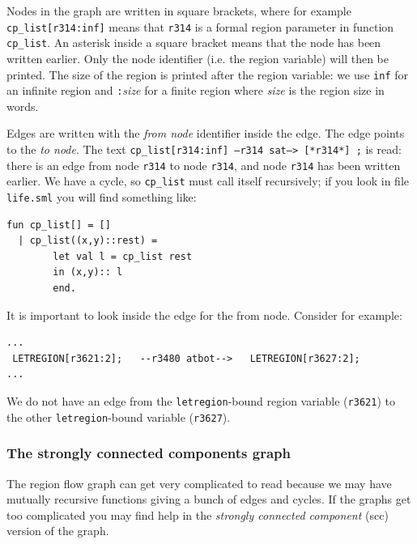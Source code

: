 \documentclass[12pt]{book}
\begin{document}
Nodes in the graph are written in square brackets, where for example
\texttt{cp\_list[r314:inf]} means that \texttt{r314} is a formal region
parameter in function \texttt{cp\_list}. An asterisk inside a square
bracket means that the node has been written earlier. Only the node
identifier (i.e. the region variable) will then be printed. The size of the
region is printed after the region variable: we use \texttt{inf} for an
infinite region and \texttt{:}\emph{size} for a finite region where
\emph{size} is the region size in words.

Edges are written with the \emph{from node} identifier inside the
edge. The edge points to the \emph{to node}. The text
\texttt{cp\_list[r314:inf]  --r314 sat-->   [*r314*] ;} is read: there
is an edge from node \texttt{r314} to node \texttt{r314}, and node
\texttt{r314} has been written earlier. We have a cycle, so
\texttt{cp\_list} must call itself recursively; if you look in file
\texttt{life.sml} you will find something like:

\begin{verbatim}
fun cp_list[] = []
  | cp_list((x,y)::rest) = 
        let val l = cp_list rest
        in (x,y):: l
        end.
\end{verbatim}
\noindent
It is important to look inside the edge for the from node. Consider for
example:
\begin{verbatim}
...
 LETREGION[r3621:2];   --r3480 atbot-->   LETREGION[r3627:2];
...
\end{verbatim}
\noindent
We do not have an edge from the \texttt{letregion}-bound region variable
(\texttt{r3621}) to the other \texttt{letregion}-bound variable (\texttt{r3627}).

\subsubsection{The strongly connected components graph}
The region flow graph can get very complicated to read because we may have
mutually recursive functions giving a bunch of edges and cycles.  If the
graphs get too complicated you may find help in the \emph{strongly
  connected component} (scc) version of the graph.
\end{document}
